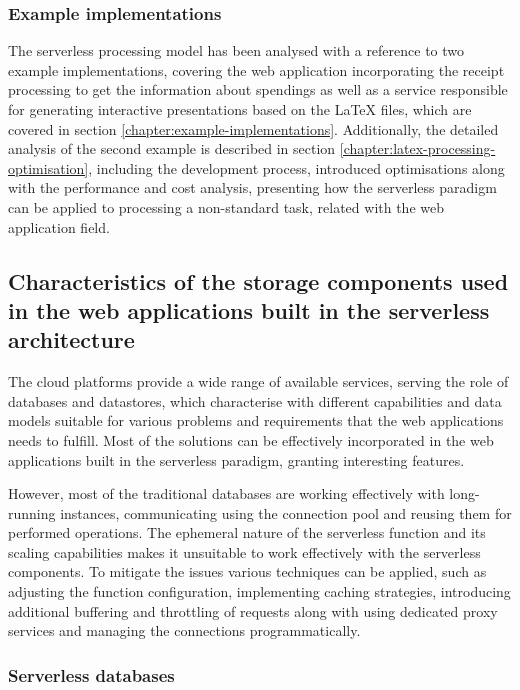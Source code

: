 \subsubsection{Example implementations}

The serverless processing model has been analysed with a reference to two example implementations, covering the web application incorporating the receipt processing to get the information about spendings as well as a service responsible for generating interactive presentations based on the LaTeX files, which are covered in section \ref{chapter:example-implementations}.
Additionally, the detailed analysis of the second example is described in section \ref{chapter:latex-processing-optimisation}, including the development process, introduced optimisations along with the performance and cost analysis, presenting how the serverless paradigm can be applied to processing a non-standard task, related with the web application field.

\subsection{Characteristics of the storage components used in the web applications built in the serverless architecture}

The cloud platforms provide a wide range of available services, serving the role of databases and datastores, which characterise with different capabilities and data models suitable for various problems and requirements that the web applications needs to fulfill.
Most of the solutions can be effectively incorporated in the web applications built in the serverless paradigm, granting interesting features.

However, most of the traditional databases are working effectively with long-running instances, communicating using the connection pool and reusing them for performed operations.
The ephemeral nature of the serverless function and its scaling capabilities makes it unsuitable to work effectively with the serverless components.
To mitigate the issues various techniques can be applied, such as adjusting the function configuration, implementing caching strategies, introducing additional buffering and throttling of requests along with using dedicated proxy services and managing the connections programmatically.

\subsubsection{Serverless databases}

